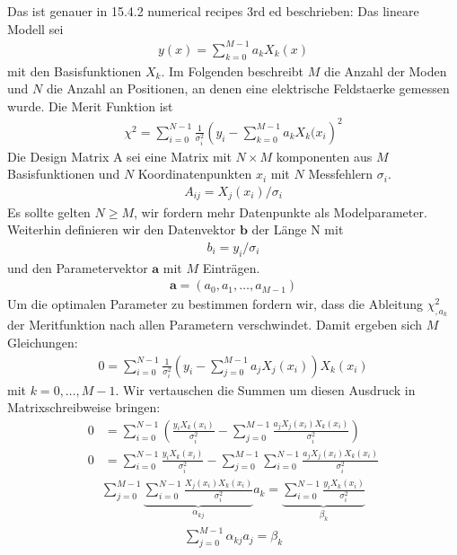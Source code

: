 \documentclass{article}
\newcommand{\vect}[1]{\mathbf{#1}}
\renewcommand{\a}{\vect a}
\def\a{\vect a}
\def\b{\vect b}
\def\({\left(}
\def\){\right)}
\begin{document}
Das ist genauer in 15.4.2 numerical recipes 3rd ed beschrieben:
Das lineare Modell sei
\begin{align}
  y(x) = \sum_{k=0}^{M-1} a_k X_k(x)
\end{align}
mit den Basisfunktionen $X_k$. Im Folgenden beschreibt $M$ die Anzahl
der Moden und $N$ die Anzahl an Positionen, an denen eine elektrische
Feldstaerke gemessen wurde. Die Merit Funktion ist
\begin{align}
  \chi^2 = \sum_{i=0}^{N-1}\frac{1}{\sigma_i^2}\(y_i- \sum_{k=0}^{M-1} a_k X_k(x_i\)^2
\end{align}
Die Design Matrix A sei eine Matrix mit $N\times M$ komponenten aus
$M$ Basisfunktionen und $N$ Koordinatenpunkten $x_i$ mit $N$
Messfehlern $\sigma_i$.
\begin{align}
  A_{ij} = X_j(x_i)/\sigma_i
\end{align}
Es sollte gelten $N\ge M$, wir fordern mehr Datenpunkte als
Modelparameter. Weiterhin definieren wir den Datenvektor $\b$ der L\"ange N mit
\begin{align}
  b_i = y_i/\sigma_i
\end{align}
und den Parametervektor $\a$ mit $M$ Eintr\"agen.
\begin{align}
  \a = (a_0, a_1,\dots,a_{M-1})
\end{align}
Um die optimalen Parameter zu bestimmen fordern wir, dass die
Ableitung $\chi^2_{,a_k}$ der Meritfunktion nach allen Parametern
verschwindet. Damit ergeben sich $M$ Gleichungen:
\begin{align}
  0 = \sum_{i=0}^{N-1}\frac{1}{\sigma_i^2}\(y_i- \sum_{j=0}^{M-1} a_j X_j(x_i)\) X_k(x_i) 
\end{align}
mit $k=0,\ldots, M-1$.  Wir vertauschen die Summen um diesen
Ausdruck in Matrixschreibweise bringen:
\begin{align}
  0 &= \sum_{i=0}^{N-1}\(\frac{y_iX_k(x_i)}{\sigma_i^2}- \sum_{j=0}^{M-1} \frac{a_j X_j(x_i)X_k(x_i)}{\sigma_i^2}\)   \\
0 &=\sum_{i=0}^{N-1} \frac{y_iX_k(x_i)}{\sigma_i^2}- \sum_{j=0}^{M-1} \sum_{i=0}^{N-1} \frac{a_j X_j(x_i)X_k(x_i)}{\sigma_i^2}
\end{align}
\begin{align}
\sum_{j=0}^{M-1} \underbrace{\sum_{i=0}^{N-1}  \frac{X_j(x_i)X_k(x_i)}{\sigma_i^2}}_{\alpha_{kj}} a_k =  \underbrace{\sum_{i=0}^{N-1}\frac{y_iX_k(x_i)}{\sigma_i^2}}_{\beta_k} 
\end{align}
\begin{align}
  \sum_{j=0}^{M-1} \alpha_{kj} a_j = \beta_k
\end{align}
\end{document}
